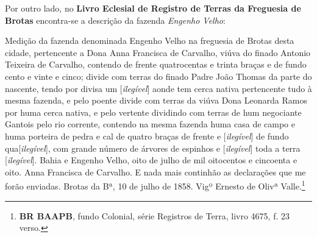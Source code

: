 Por outro lado, no \textbf{Livro Eclesial de Registro de Terras da Freguesia de Brotas} encontra-se a descrição da fazenda \textit{Engenho Velho}:

\begin{citacao}
Medição da fazenda denominada Engenho Velho na freguesia de Brotas desta cidade, pertencente a Dona Anna Francisca de Carvalho, viúva do finado Antonio Teixeira de Carvalho, contendo de frente quatrocentas e trinta braças e de fundo cento e vinte e cinco; divide com terras do finado Padre João Thomas da parte do nascente, tendo por divisa um [\textit{ilegível}] aonde tem cerca nativa pertencente tudo à mesma fazenda, e pelo poente divide com terras da viúva Dona Leonarda Ramos por huma cerca nativa, e pelo vertente dividindo com terras de hum negociante Gantois pelo rio corrente, contendo na mesma fazenda huma casa de campo e huma porteira de pedra e cal de quatro braças de frente e [\textit{ilegível}] de fundo qua[\textit{ilegível}], com grande número de árvores de espinhos e [\textit{ilegível}] toda a terra [\textit{ilegível}]. Bahia e Engenho Velho, oito de julho de mil oitocentos e cincoenta e oito. Anna Francisca de Carvalho. E nada mais continhão as declarações que me forão enviadas. Brotas da Bª, 10 de julho de 1858. Vigº Ernesto de Olivª Valle.\footnote{\textbf{BR BAAPB}, fundo Colonial, série Registros de Terra, livro 4675, f. 23 verso.}
\end{citacao}

